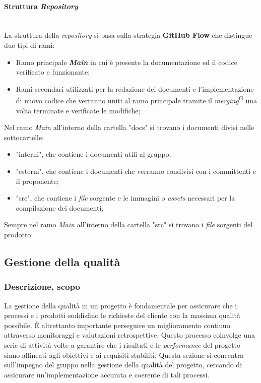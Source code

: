 \documentclass[5pt]{article}
\begin{document}
    \paragraph{Struttura \textit{Repository}}~\\
    La struttura della \textit{repository} si basa sulla strategia \textbf{GitHub Flow} che distingue due tipi di rami:
    \begin{itemize}
    	\item Ramo principale \textbf{\textit{Main}} in cui è presente la documentazione ed il codice verificato e funzionante;
    	\item Rami secondari utilizzati per la redazione dei documenti e l'implementazione di nuovo codice che verranno uniti al ramo principale tramite il \textit{merging}\textsuperscript{G} una volta terminate e verificate le modifiche;
    \end{itemize}
    Nel ramo \textit{Main} all'interno della cartella "docs" si trovano i documenti divisi nelle sottocartelle:
    \begin{itemize}
    	\item "interni", che contiene i documenti utili al gruppo;
    	\item "esterni", che contiene i documenti che verranno condivisi con i committenti e il proponente;
    	\item "src", che contiene i \textit{file} sorgente e le immagini o \textit{assets} necessari per la compilazione dei documenti;
    \end{itemize}
    Sempre nel ramo \textit{Main} all'interno della cartella "src" si trovano i \textit{file} sorgenti del prodotto.
    
\subsection{Gestione della qualità}
    \subsubsection{Descrizione, scopo}
    La gestione della qualità in un progetto è fondamentale per assicurare che i processi e i prodotti soddisfino le richieste del cliente con la massima qualità possibile. È altrettanto importante perseguire un miglioramento continuo attraverso monitoraggi e valutazioni retrospettive. Questo processo coinvolge una serie di attività volte a garantire che i risultati e le \textit{performance} del progetto siano allineati agli obiettivi e ai requisiti stabiliti. Questa sezione si concentra sull'impegno del gruppo nella gestione della qualità del progetto, cercando di assicurare un'implementazione accurata e coerente di tali processi.
\end{document}
